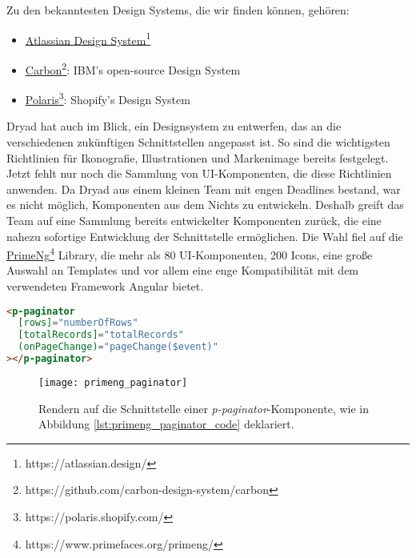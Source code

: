 Zu den bekanntesten Design Systems, die wir finden können, gehören:

\begin{itemize}
  \item \href{https://atlassian.design/}{Atlassian Design System}\footnote{https://atlassian.design/}
  \item \href{https://github.com/carbon-design-system/carbon}{Carbon}\footnote{https://github.com/carbon-design-system/carbon}: IBM’s open-source Design System
  \item \href{https://polaris.shopify.com/}{Polaris}\footnote{https://polaris.shopify.com/}: Shopify's Design System
\end{itemize}

Dryad hat auch im Blick, ein Designsystem zu entwerfen, das an die verschiedenen zukünftigen Schnittstellen angepasst ist.
So sind die wichtigsten Richtlinien für Ikonografie, Illustrationen und Markenimage bereits festgelegt.
Jetzt fehlt nur noch die Sammlung von \ac{UI}-Komponenten, die diese Richtlinien anwenden.
Da Dryad aus einem kleinen Team mit engen Deadlines bestand, war es nicht möglich, Komponenten aus dem Nichts zu entwickeln.
Deshalb greift das Team auf eine Sammlung bereits entwickelter Komponenten zurück, die eine nahezu sofortige Entwicklung der Schnittstelle ermöglichen.
Die Wahl fiel auf die \href{https://www.primefaces.org/primeng/}{PrimeNg}\footnote{https://www.primefaces.org/primeng/} Library, die mehr als 80 \ac{UI}-Komponenten, 200 Icons, eine große Auswahl an Templates und vor allem eine enge Kompatibilität mit dem verwendeten Framework Angular bietet.\\

\begin{lstlisting}[language=html,caption={Beispiel für die Verwendung der Komponente \textit{p-paginator}, mit der eine Schnittstelle mit Paging einfach verwaltet werden kann.},captionpos=b,label=lst:primeng_paginator_code]
<p-paginator
  [rows]="numberOfRows"
  [totalRecords]="totalRecords"
  (onPageChange)="pageChange($event)"
></p-paginator>
\end{lstlisting}

\begin{figure}[h]
  \centering
  \texttt{[image: primeng\_paginator]}
  \caption{Rendern auf die Schnittstelle einer \textit{p-paginator}-Komponente, wie in Abbildung \ref{lst:primeng_paginator_code} deklariert.}
  \label{fig:primeng_paginator}
\end{figure}
